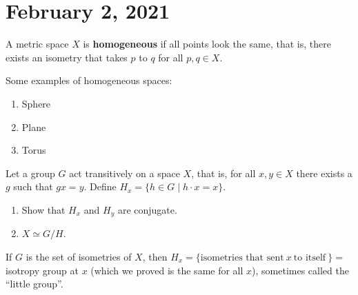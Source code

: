 \section{February 2, 2021}
\begin{definition}[]
    A metric space $X$ is \textbf{homogeneous} if all points look the same, that is, there exists an isometry that takes $p$ to $q$ for all $p,q\in X$.
\end{definition}
\begin{example}
    Some examples of homogeneous spaces:
    \begin{enumerate}
        \item Sphere
        \item Plane
        \item Torus
    \end{enumerate}
\end{example}
Let a group $G$ act transitively on a space $X$, that is, for all $x,y \in X$ there exists a $g$ such that $gx=y$. Define $H_x= \{h\in G \mid h\cdot x=x\} $. 
\begin{enumerate}
    \item Show that $H_x$ and $H_y$ are conjugate.
    \item $X\simeq G /H$.
\end{enumerate}
If $G$ is the set of isometries of $X$, then $H_x= \{\text{isometries that sent} \ x \ \text{to itself} \ \} =$ isotropy group at $x$ (which we proved is the same for all $x$), sometimes called the ``little group''.
